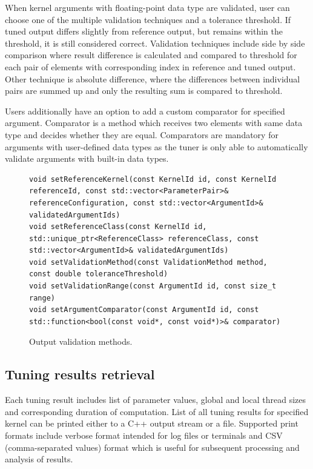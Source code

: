 \documentclass
[
    digital, %
    oneside, %
    table, %
    nolof, %
    nolot, %
    nocover %
]{fithesis3}
\begin{document}
When kernel arguments with floating-point data type are validated, user can choose one of the multiple validation techniques and a tolerance threshold.
If tuned output differs slightly from reference output, but remains within the threshold, it is still considered correct. Validation techniques include
side by side comparison where result difference is calculated and compared to threshold for each pair of elements with corresponding index in reference
and tuned output. Other technique is absolute difference, where the differences between individual pairs are summed up and only the resulting sum is
compared to threshold.

Users additionally have an option to add a custom comparator for specified argument. Comparator is a method which receives two elements with same data
type and decides whether they are equal. Comparators are mandatory for arguments with user-defined data types as the tuner is only able to automatically
validate arguments with built-in data types.

\begin{figure}
\begin{adjustwidth}{-1cm}{-1cm}
\begin{lstlisting}
void setReferenceKernel(const KernelId id, const KernelId referenceId, const std::vector<ParameterPair>& referenceConfiguration, const std::vector<ArgumentId>& validatedArgumentIds)
void setReferenceClass(const KernelId id, std::unique_ptr<ReferenceClass> referenceClass, const std::vector<ArgumentId>& validatedArgumentIds)
void setValidationMethod(const ValidationMethod method, const double toleranceThreshold)
void setValidationRange(const ArgumentId id, const size_t range)
void setArgumentComparator(const ArgumentId id, const std::function<bool(const void*, const void*)>& comparator)
\end{lstlisting}
\caption{Output validation methods.}
\label{ktt-validation-methods}
\end{adjustwidth}
\end{figure}

\subsection{Tuning results retrieval}
Each tuning result includes list of parameter values, global and local thread sizes and corresponding duration of computation. List of all tuning
results for specified kernel can be printed either to a C++ output stream or a file. Supported print formats include verbose format intended for log
files or terminals and CSV (comma-separated values) format which is useful for subsequent processing and analysis of results.
\end{document}
